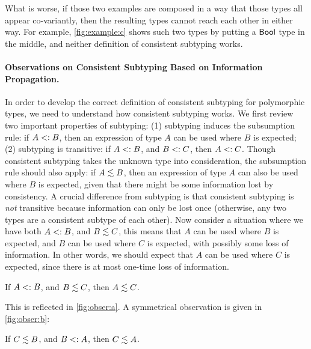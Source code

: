 What is worse, if those two examples are composed in a way that those types all
appear co-variantly, then the resulting types cannot reach each other
in either
way. For example, \cref{fig:example:c} shows such two types by putting a
$\mathsf{Bool}$ type in the middle, and neither definition of consistent subtyping
works. %

\paragraph{Observations on Consistent Subtyping Based on Information Propagation.}

In order to develop the correct definition of consistent subtyping for
polymorphic types, we need to understand how consistent subtyping works.
We first review two important properties of subtyping: (1) subtyping induces the
subsumption rule: if $A <: B$, then an expression of type $A$ can be used
where $B$ is expected; (2) subtyping is transitive: if $A <: B$, and $B <:
C$, then $A <: C$. Though consistent subtyping takes the unknown type into
consideration, the subsumption rule should also apply: if $A \lesssim B$, then
an expression of type $A$ can also be used where $B$ is expected, given that
there might be some information lost by consistency. A crucial difference from
subtyping is that consistent subtyping is \textit{not} transitive because
information can only be lost once (otherwise, any two types are a consistent
subtype of each other). Now consider a situation where we have both $A <: B$,
and $B \lesssim C$, this means that $A$ can be used where $B$ is expected, and
$B$ can be used where $C$ is expected, with possibly some loss of information. In
other words, we should expect that $A$ can be used where $C$ is expected, since
there is at most one-time loss of information.

\begin{observation}
  If $A <: B$, and $B \lesssim C$, then $A \lesssim C$.
\end{observation}

This is reflected in \cref{fig:obser:a}. A symmetrical
observation is given in \cref{fig:obser:b}:


\begin{observation}
  If $C \lesssim B$, and $B <: A$, then $C \lesssim A$.
\end{observation}

